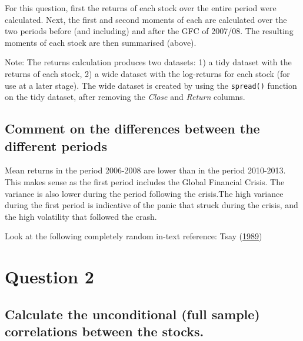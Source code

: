 \documentclass[11pt,preprint, authoryear]{elsarticle}
\numberwithin{equation}{section}
\numberwithin{figure}{section}
\numberwithin{table}{section}
\begin{document}
For this question, first the returns of each stock over the entire
period were calculated. Next, the first and second moments of each are
calculated over the two periods before (and including) and after the GFC
of 2007/08. The resulting moments of each stock are then summarised
(above).

Note: The returns calculation produces two datasets: 1) a tidy dataset
with the returns of each stock, 2) a wide dataset with the log-returns
for each stock (for use at a later stage). The wide dataset is created
by using the \texttt{spread()} function on the tidy dataset, after
removing the \emph{Close} and \emph{Return} columns.

\subsection{Comment on the differences between the different
periods}\label{comment-on-the-differences-between-the-different-periods}

Mean returns in the period 2006-2008 are lower than in the period
2010-2013. This makes sense as the first period includes the Global
Financial Crisis. The variance is also lower during the period following
the crisis.The high variance during the first period is indicative of
the panic that struck during the crisis, and the high volatility that
followed the crash.

Look at the following completely random in-text reference: Tsay
(\protect\hyperlink{ref-tsay1989}{1989})

\section{\texorpdfstring{Question 2
\label{Q2}}{Question 2 }}\label{question-2}

\subsection{Calculate the unconditional (full sample) correlations
between the
stocks.}\label{calculate-the-unconditional-full-sample-correlations-between-the-stocks.}
\end{document}
